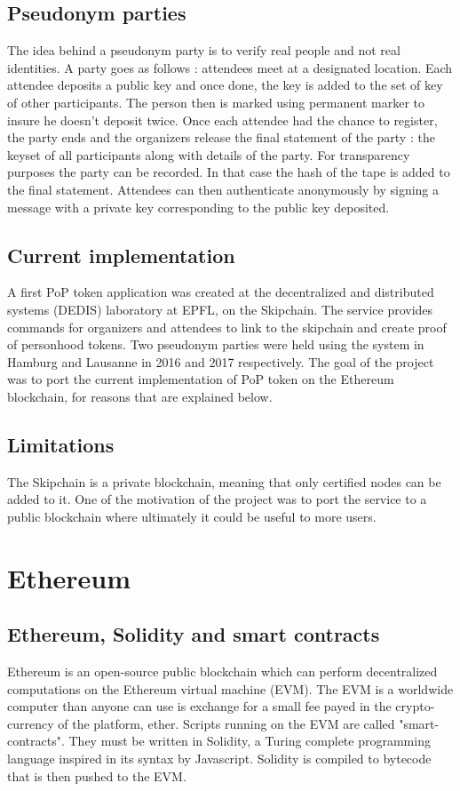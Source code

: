 \documentclass[11pt, a4paper, twoside, openright]{article} %
\begin{document}
\subsection{Pseudonym parties}

The idea behind a pseudonym party is to verify real people and not real identities. A party goes as follows :  attendees meet at a designated location. Each attendee deposits a public key and once done, the key is added to the set of key of other participants. The person then is marked using permanent marker to insure he doesn't deposit twice. Once each attendee had the chance to register, the party ends and the organizers release the final statement of the party : the keyset of all participants along with details of the party. For transparency purposes the party can be recorded. In that case the hash of the tape is added to the final statement. Attendees can then authenticate anonymously by signing a message with a private key corresponding to the public key deposited.

\subsection{Current implementation}
A first PoP token application was created at the decentralized and distributed systems (DEDIS) laboratory at EPFL, on the Skipchain. The service provides commands for organizers and attendees to link to the skipchain and create proof of personhood tokens. Two pseudonym parties were held using the system in Hamburg and Lausanne in 2016 and 2017 respectively.
The goal of the project was to port the current implementation of PoP token on the Ethereum blockchain, for reasons that are explained below.

\subsection{Limitations}
The Skipchain is a private blockchain, meaning that only certified nodes can be added to it. One of the motivation of the project was to port the service to a public blockchain where ultimately it could be useful to more users.

\section{Ethereum}

\subsection{Ethereum, Solidity and smart contracts}
Ethereum is an open-source public blockchain which can perform decentralized computations on the Ethereum virtual machine (EVM). The EVM is a worldwide computer than anyone can use is exchange for a small fee payed in the crypto-currency of the platform, ether. Scripts running on the EVM are called "smart-contracts". They must be written in Solidity, a Turing complete programming language inspired in its syntax by Javascript. Solidity is compiled to bytecode that is then pushed to the EVM.
\end{document}

